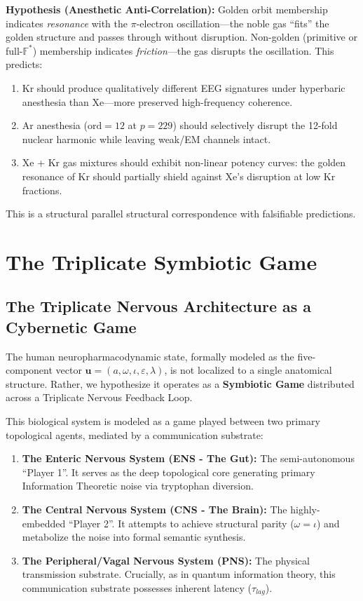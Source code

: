 \begin{remark}
\textbf{Hypothesis (Anesthetic Anti-Correlation):} Golden orbit membership indicates \emph{resonance} with the $\pi$-electron oscillation---the noble gas ``fits'' the golden structure and passes through without disruption. Non-golden (primitive or full-$\mathbb{F}^*$) membership indicates \emph{friction}---the gas disrupts the oscillation. This predicts:
\begin{enumerate}[noitemsep]
  \item Kr should produce qualitatively different EEG signatures under hyperbaric anesthesia than Xe---more preserved high-frequency coherence.
  \item Ar anesthesia ($\mathrm{ord} = 12$ at $p = 229$) should selectively disrupt the 12-fold nuclear harmonic while leaving weak/EM channels intact.
  \item Xe + Kr gas mixtures should exhibit non-linear potency curves: the golden resonance of Kr should partially shield against Xe's disruption at low Kr fractions.
\end{enumerate}
This is a structural parallel structural correspondence with falsifiable predictions.
\end{remark}

\section{The Triplicate Symbiotic Game}

\subsection{The Triplicate Nervous Architecture as a Cybernetic Game}

The human neuropharmacodynamic state, formally modeled as the five-component vector $\mathbf{u} = (a, \omega, \iota, \varepsilon, \lambda)$, is not localized to a single anatomical structure. Rather, we hypothesize it operates as a \textbf{Symbiotic Game} distributed across a Triplicate Nervous Feedback Loop.

This biological system is modeled as a game played between two primary topological agents, mediated by a communication substrate:
\begin{enumerate}
    \item \textbf{The Enteric Nervous System (ENS - The Gut):} The semi-autonomous ``Player 1''. It serves as the deep topological core generating primary Information Theoretic noise via tryptophan diversion.
    \item \textbf{The Central Nervous System (CNS - The Brain):} The highly-embedded ``Player 2''. It attempts to achieve structural parity ($\omega = \iota$) and metabolize the noise into formal semantic synthesis.
    \item \textbf{The Peripheral/Vagal Nervous System (PNS):} The physical transmission substrate. Crucially, as in quantum information theory, this communication substrate possesses inherent latency ($\tau_{lag}$).
\end{enumerate}

